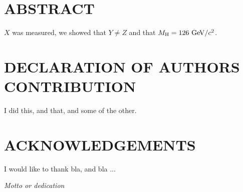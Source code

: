 \chapter*{ABSTRACT}
%
$X$ was measured, we showed that $Y \neq Z$ and that $M_{\rm H} = 126 \GeV/c^2$.
%
\clearpage
\chapter*{DECLARATION OF AUTHORS CONTRIBUTION}
%
I did this, and that, and some of the other.
%
\clearpage
\chapter*{ACKNOWLEDGEMENTS}
%
I would like to thank bla, and bla ...
%
\cleardoublepage
~
\vspace*{\fill}
\begin{center}
  \emph{Motto or dedication}
\end{center}
\vspace*{\fill}
\cleardoublepage

